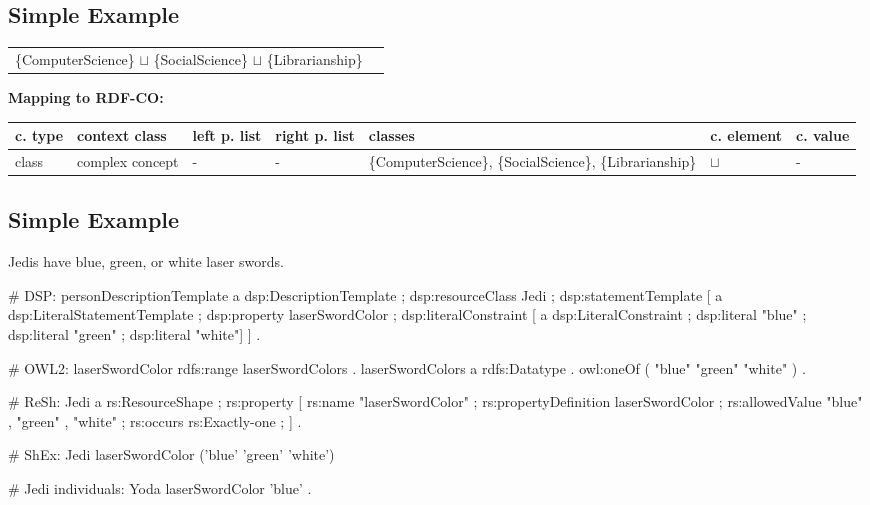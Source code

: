 \documentclass{llncs}
\newenvironment{gcotable}{
  \scriptsize
  \sffamily
  \vspace{0cm}
	\begin{center}
	\textbf{\vspace{0.4cm}Mapping to RDF-CO:} \\
  \begin{tabular}{l|l|l|l|l|l|l}
	\hline
  \textbf{c. type} & \textbf{context class} & \textbf{left p. list} & \textbf{right p. list} & \textbf{classes} & \textbf{c. element} & \textbf{c. value} \\
  \hline

}{
  \hline
  \end{tabular}
	\end{center}
}
\newenvironment{DL}{
  \vspace{0cm}
	\begin{center}
  \begin{tabular}{r l}

}{
  \end{tabular}
	\end{center}
}
\begin{document}
\subsection{Simple Example}

\begin{DL}
\{ComputerScience\} $\sqcup$ \{SocialScience\} $\sqcup$ \{Librarianship\} \\
\end{DL}

\begin{gcotable}
class & complex concept & - & - & \{ComputerScience\}, \{SocialScience\}, \{Librarianship\} & $\sqcup$ & - \\
\end{gcotable}

\subsection{Simple Example}

Jedis have blue, green, or white laser swords.

\begin{ex}
# DSP:
personDescriptionTemplate
    a dsp:DescriptionTemplate ;
    dsp:resourceClass Jedi ;
    dsp:statementTemplate [
        a dsp:LiteralStatementTemplate ;
        dsp:property laserSwordColor ;
        dsp:literalConstraint [
            a dsp:LiteralConstraint ;
            dsp:literal "blue" ;
            dsp:literal "green" ;
            dsp:literal "white"] ] .
\end{ex}

\begin{ex}
# OWL2:
laserSwordColor rdfs:range laserSwordColors . 
laserSwordColors
    a rdfs:Datatype .
    owl:oneOf ( "blue" "green" "white" ) .
\end{ex}

\begin{ex}
# ReSh:
Jedi a rs:ResourceShape ;
    rs:property [
        rs:name "laserSwordColor" ;
        rs:propertyDefinition laserSwordColor ;
        rs:allowedValue "blue" , "green" , "white" ;
        rs:occurs rs:Exactly-one ; ] .
\end{ex}

\begin{ex}
# ShEx:
Jedi {
    laserSwordColor ('blue' 'green' 'white') }
\end{ex}

\begin{ex}
# Jedi individuals:
Yoda 
    laserSwordColor 'blue' .
\end{ex}
\end{document}

